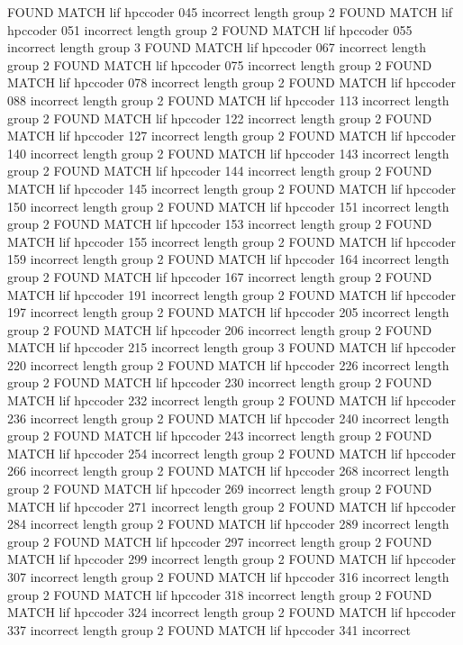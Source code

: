 FOUND MATCH lif hpccoder 045 incorrect
length group  2
FOUND MATCH lif hpccoder 051 incorrect
length group  2
FOUND MATCH lif hpccoder 055 incorrect
length group  3
FOUND MATCH lif hpccoder 067 incorrect
length group  2
FOUND MATCH lif hpccoder 075 incorrect
length group  2
FOUND MATCH lif hpccoder 078 incorrect
length group  2
FOUND MATCH lif hpccoder 088 incorrect
length group  2
FOUND MATCH lif hpccoder 113 incorrect
length group  2
FOUND MATCH lif hpccoder 122 incorrect
length group  2
FOUND MATCH lif hpccoder 127 incorrect
length group  2
FOUND MATCH lif hpccoder 140 incorrect
length group  2
FOUND MATCH lif hpccoder 143 incorrect
length group  2
FOUND MATCH lif hpccoder 144 incorrect
length group  2
FOUND MATCH lif hpccoder 145 incorrect
length group  2
FOUND MATCH lif hpccoder 150 incorrect
length group  2
FOUND MATCH lif hpccoder 151 incorrect
length group  2
FOUND MATCH lif hpccoder 153 incorrect
length group  2
FOUND MATCH lif hpccoder 155 incorrect
length group  2
FOUND MATCH lif hpccoder 159 incorrect
length group  2
FOUND MATCH lif hpccoder 164 incorrect
length group  2
FOUND MATCH lif hpccoder 167 incorrect
length group  2
FOUND MATCH lif hpccoder 191 incorrect
length group  2
FOUND MATCH lif hpccoder 197 incorrect
length group  2
FOUND MATCH lif hpccoder 205 incorrect
length group  2
FOUND MATCH lif hpccoder 206 incorrect
length group  2
FOUND MATCH lif hpccoder 215 incorrect
length group  3
FOUND MATCH lif hpccoder 220 incorrect
length group  2
FOUND MATCH lif hpccoder 226 incorrect
length group  2
FOUND MATCH lif hpccoder 230 incorrect
length group  2
FOUND MATCH lif hpccoder 232 incorrect
length group  2
FOUND MATCH lif hpccoder 236 incorrect
length group  2
FOUND MATCH lif hpccoder 240 incorrect
length group  2
FOUND MATCH lif hpccoder 243 incorrect
length group  2
FOUND MATCH lif hpccoder 254 incorrect
length group  2
FOUND MATCH lif hpccoder 266 incorrect
length group  2
FOUND MATCH lif hpccoder 268 incorrect
length group  2
FOUND MATCH lif hpccoder 269 incorrect
length group  2
FOUND MATCH lif hpccoder 271 incorrect
length group  2
FOUND MATCH lif hpccoder 284 incorrect
length group  2
FOUND MATCH lif hpccoder 289 incorrect
length group  2
FOUND MATCH lif hpccoder 297 incorrect
length group  2
FOUND MATCH lif hpccoder 299 incorrect
length group  2
FOUND MATCH lif hpccoder 307 incorrect
length group  2
FOUND MATCH lif hpccoder 316 incorrect
length group  2
FOUND MATCH lif hpccoder 318 incorrect
length group  2
FOUND MATCH lif hpccoder 324 incorrect
length group  2
FOUND MATCH lif hpccoder 337 incorrect
length group  2
FOUND MATCH lif hpccoder 341 incorrect
